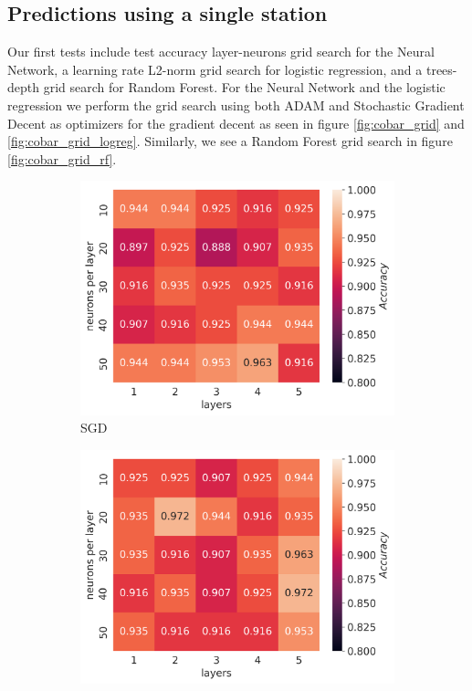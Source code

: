 \documentclass[11pt]{article}
\begin{document}
\subsection{Predictions using a single station}
Our first tests include test accuracy layer-neurons grid search for the Neural Network, a learning rate L2-norm grid search for logistic regression, and a trees-depth grid search for Random Forest. For the Neural Network and the logistic regression we perform the grid search using both ADAM and Stochastic Gradient Decent as optimizers for the gradient decent as seen in figure \ref{fig:cobar_grid} and \ref{fig:cobar_grid_logreg}. Similarly, we see a Random Forest grid search in figure \ref{fig:cobar_grid_rf}.
\begin{figure}[H]
    \begin{subfigure}{.5\textwidth}
        \centering
        \includegraphics[width=\textwidth]{../figures/NN_grid_SGD_bootstrap_cobar.png}
        \caption{SGD}
        \label{fig:}
    \end{subfigure}
    \begin{subfigure}{.5\textwidth}
        \centering
        \includegraphics[width=\textwidth]{../figures/NN_grid_ADAM_bootstrap_Cobar.png}

\end{subfigure}
\end{figure}
\end{document}
